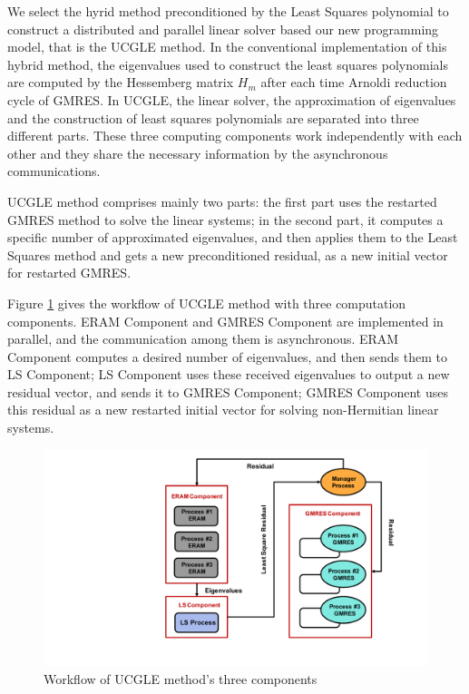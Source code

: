 We select the hyrid method preconditioned by the Least Squares polynomial to construct a distributed and parallel linear solver based our new programming model, that is the UCGLE method. In the conventional implementation of this hybrid method, the eigenvalues used to construct the least squares polynomials are computed by the Hessemberg matrix $H_m$ after each time Arnoldi reduction cycle of GMRES. In UCGLE, the linear solver, the approximation of eigenvalues and the construction of least squares polynomials are separated into three different parts. These three computing components work independently with each other and they share the necessary information by the asynchronous communications.

UCGLE method comprises mainly two parts: the first part uses the restarted GMRES method to solve the linear systems; in the second part, it computes a specific number of approximated eigenvalues, and then applies them to the Least Squares method and gets a new preconditioned residual, as a new initial vector for restarted GMRES. 

Figure \ref{fig:worflow} gives the workflow of UCGLE method with three computation components. ERAM Component and GMRES Component are implemented in parallel, and the communication among them is asynchronous. ERAM Component computes a desired number of eigenvalues, and then sends them to LS Component; LS Component uses these received eigenvalues to output a new residual vector, and sends it to GMRES Component; GMRES Component uses this residual as a new restarted initial vector for solving non-Hermitian linear systems.

\begin{figure}[htbp]
	\centering
	\includegraphics[width=5.2in]{fig/workflow.pdf}
	\caption{Workflow of UCGLE method's three components}
	\label{fig:worflow}
\end{figure}


